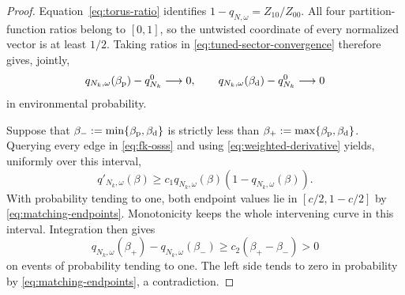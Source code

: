 \begin{proof}
Equation~\eqref{eq:torus-ratio} identifies
$1-q_{N,\omega}=Z_{10}/Z_{00}$. All four partition-function ratios
belong to $[0,1]$, so the untwisted coordinate of every normalized
vector is at least $1/2$. Taking ratios in
\eqref{eq:tuned-sector-convergence} therefore gives, jointly,
\begin{equation}
 q_{N_k,\omega}(\beta_{\rm p})-q_{N_k}^0\longrightarrow0,
 \qquad
 q_{N_k,\omega}(\beta_{\rm d})-q_{N_k}^0\longrightarrow0
 \label{eq:matching-endpoints}
\end{equation}
in environmental probability.

Suppose that $\beta_-:=\min\{\beta_{\rm p},\beta_{\rm d}\}$ is
strictly less than
$\beta_+:=\max\{\beta_{\rm p},\beta_{\rm d}\}$. Querying every
edge in \eqref{eq:fk-osss} and using
\eqref{eq:weighted-derivative} yields, uniformly over this interval,
\[
 q'_{N_k,\omega}(\beta)
       \ge c_1q_{N_k,\omega}(\beta)(1-q_{N_k,\omega}(\beta)).
\]
With probability tending to one, both endpoint values lie in
$[c/2,1-c/2]$ by \eqref{eq:matching-endpoints}. Monotonicity keeps
the whole intervening curve in this interval. Integration then gives
\[
 q_{N_k,\omega}(\beta_+)-q_{N_k,\omega}(\beta_-)
       \ge c_2(\beta_+-\beta_-)>0
\]
on events of probability tending to one. The left side tends to zero
in probability by \eqref{eq:matching-endpoints}, a contradiction.
\end{proof}
